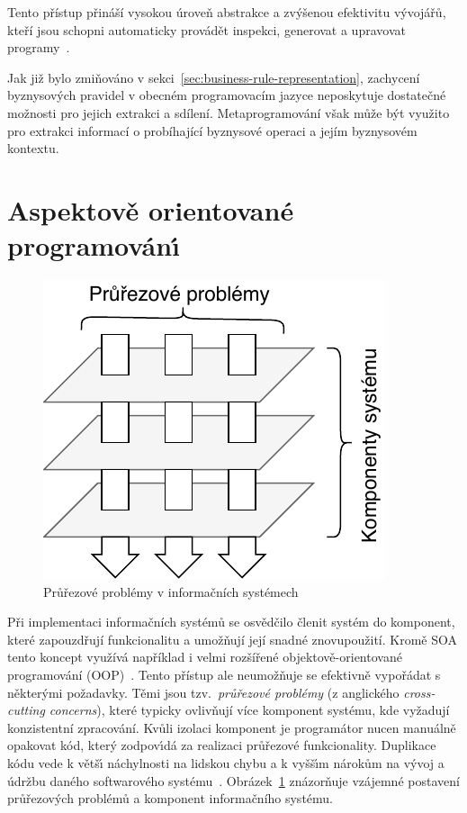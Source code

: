 Tento přístup přináší vysokou úroveň abstrakce a zvýšenou efektivitu
vývojářů, kteří jsou schopni automaticky provádět inspekci, generovat a upravovat
programy~\cite{sheard2001accomplishments}.

Jak již bylo zmiňováno v sekci~\ref{sec:business-rule-representation}, zachycení byznysových
pravidel v obecném programovacím jazyce neposkytuje dostatečné možnosti pro jejich extrakci
a sdílení. Metaprogramování však může být využito pro extrakci informací o probíhající
byznysové operaci a jejím byznysovém kontextu.

\section{Aspektově orientované programován\'{\i}}\label{sec:aop}


\begin{figure}[t]
    \centering
    \includegraphics[keepaspectratio=true, width=0.35\linewidth]{figures/cross-cutting.pdf}
    \caption{Průřezové problémy v informačních systémech}
    \label{fig:cross-cutting}
\end{figure}

Při implementaci informačních systémů se osvědčilo členit systém do komponent, které
zapouzdřují funkcionalitu a umožňují její snadné znovupoužití. Kromě \gls{SOA} tento koncept
využívá například i velmi rozšířené objektově-orientované programování (\gls{OOP})~\cite{rentsch1982object}.
Tento přístup ale neumožňuje se efektivně vypořádat s některými požadavky.
Těmi jsou tzv.~\textit{průřezové problémy} (z anglického \textit{cross-cutting concerns}),
které typicky ovlivňují více komponent systému, kde vyžadují konzistentní zpracování.
Kvůli izolaci komponent je programátor nucen manuálně opakovat
kód, kter\'y zodpov\'{\i}dá za realizaci průřezové funkcionality. Duplikace kódu
vede k větš\'{\i} náchylnosti na lidskou chybu a k vyšš\'{\i}m nárokům na v\'yvoj
a údržbu daného softwarového systému~\cite{fowler1999refactoring}.
Obrázek~\ref{fig:cross-cutting} znázorňuje vzájemné postavení průřezových
problémů a komponent informačního systému.


